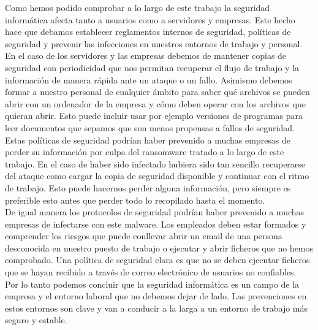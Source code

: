 Como hemos podido comprobar a lo largo de este trabajo la seguridad informática afecta tanto a usuarios como a servidores y empresas. Este hecho hace que debamos establecer reglamentos internos de seguridad, políticas de seguridad y prevenir las infecciones en nuestros entornos de trabajo y personal.\\
En el caso de los servidores y las empresas debemos de mantener copias de seguridad con periodicidad que nos permitan recuperar el flujo de trabajo y la información de manera rápida ante un ataque o un fallo. Asimismo debemos formar a nuestro personal de cualquier ámbito para saber qué archivos se pueden abrir con un ordenador de la empresa y cómo deben operar con los archivos que quieran abrir. Esto puede incluir usar por ejemplo versiones de programas para leer documentos que sepamos que son menos propensas a fallos de seguridad.\\
Estas políticas de seguridad podrían haber prevenido a muchas empresas de perder su información por culpa del ransomware tratado a lo largo de este trabajo. En el caso de haber sido infectado hubiera sido tan sencillo recuperarse del ataque como cargar la copia de seguridad disponible y continuar con el ritmo de trabajo. Esto puede hacernos perder alguna información, pero siempre es preferible esto antes que perder todo lo recopilado hasta el momento. \\
De igual manera los protocolos de seguridad podrían haber prevenido a muchas empresas de infectarse con este malware. Los empleados deben estar formados y comprender los riesgos que puede conllevar abrir un email de una persona desconocida en nuestro puesto de trabajo o ejecutar y abrir ficheros que no hemos comprobado. Una política de seguridad clara es que no se deben ejecutar ficheros que se hayan recibido a través de correo electrónico de usuarios no confiables.\\
Por lo tanto podemos concluir que la seguridad informática es un campo de la empresa y el entorno laboral que no debemos dejar de lado. Las prevenciones en estos entornos son clave y van a conducir a la larga a un entorno de trabajo más seguro y estable.